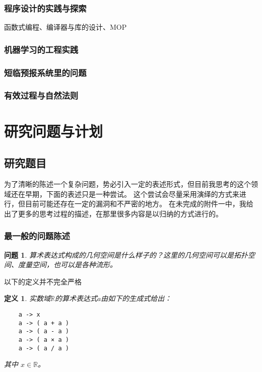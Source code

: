 \documentclass[a4paper,12pt]{article}
\newtheorem{problem}{问题}
\numberwithin{problem}{section}
\newtheorem{definition}{定义}
\numberwithin{definition}{section}
\numberwithin{lemma}{section}
\numberwithin{proposition}{section}
\numberwithin{theorem}{section}
\numberwithin{grammar}{section}
\numberwithin{program}{section}
\numberwithin{convention}{section}
\numberwithin{corollary}{section}
\begin{document}
\subsubsection{程序设计的实践与探索}

函数式编程、编译器与库的设计、MOP

\subsubsection{机器学习的工程实践}

\subsubsection{短临预报系统里的问题}

\subsubsection{有效过程与自然法则}

\newpage

\section{研究问题与计划}

\subsection{研究题目}

为了清晰的陈述一个复杂问题，势必引入一定的表述形式，但目前我思考的这个领域还在早期，下面的表述只是一种尝试。
这个尝试会尽量采用演绎的方式来进行，但目前可能还存在一定的漏洞和不严密的地方。
在未完成的附件一中，我给出了更多的思考过程的描述，在那里很多内容是以归纳的方式进行的。

\subsubsection{最一般的问题陈述}

\begin{problem}
    算术表达式构成的几何空间是什么样子的？这里的几何空间可以是拓扑空间、度量空间，也可以是各种流形。
\end{problem}

以下的定义并不完全严格

\begin{definition}
    实数域$\mathbb{R}$的算术表达式$a$由如下的生成式给出：
    \begin{lstlisting}
    a -> x
    a -> ( a + a )
    a -> ( a - a )
    a -> ( a × a )
    a -> ( a / a )
    \end{lstlisting}
    其中 $x \in \mathbb{R}$。
\end{definition}
\end{document}
